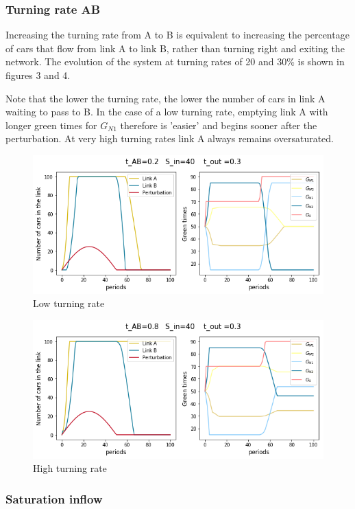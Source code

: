 \documentclass[11pt]{article}
\begin{document}
\subsubsection{Turning rate AB}

Increasing the turning rate from A to B is equivalent to increasing the percentage of cars that flow from link A to link B, rather than turning right and exiting the network. The evolution of the system at turning rates of 20 and 30\% is shown in figures 3 and 4.

Note that the lower the turning rate, the lower the number of cars in link A waiting to pass to B. In the case of a low turning rate, emptying link A with longer green times for $G_{N1}$ therefore is 'easier' and begins sooner after the perturbation. At very high turning rates link A always remains oversaturated. %

\begin{figure}[h!]
    \caption{Low turning rate}
      \centering
	\includegraphics[width=13cm]{sim1}
\end{figure}

\begin{figure}[h!]
    \caption{High turning rate}
      \centering
	\includegraphics[width=13cm]{sim8}
\end{figure}


\subsubsection{Saturation inflow}
\end{document}
